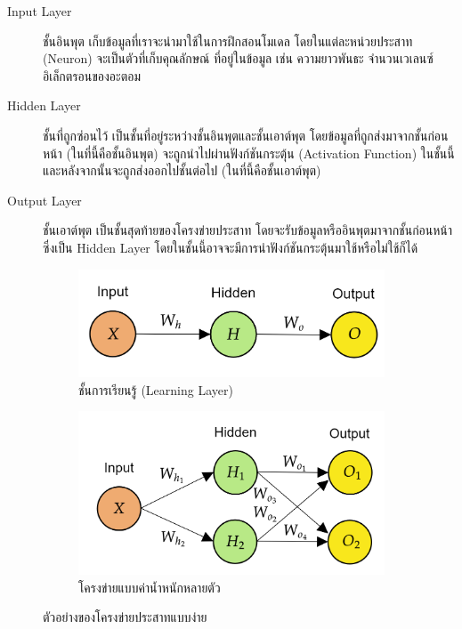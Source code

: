 \begin{description}
    \item[Input Layer] ชั้นอินพุต เก็บข้อมูลที่เราจะนำมาใช้ในการฝึกสอนโมเดล โดยในแต่ละหน่วยประสาท (Neuron) จะเป็นตัวที่เก็บคุณลักษณ์%
    ที่อยู่ในข้อมูล เช่น ความยาวพันธะ จำนวนเวเลนซ์อิเล็กตรอนของอะตอม
    
    \item[Hidden Layer] ชั้นที่ถูกซ่อนไว้ เป็นชั้นที่อยู่ระหว่างชั้นอินพุตและชั้นเอาต์พุต โดยข้อมูลที่ถูกส่งมาจากชั้นก่อนหน้า (ในที่นี้คือชั้นอินพุต)
    จะถูกนำไปผ่านฟังก์ชันกระตุ้น (Activation Function) ในชั้นนี้ และหลังจากนั้นจะถูกส่งออกไปชั้นต่อไป (ในที่นี้คือชั้นเอาต์พุต)
    
    \item[Output Layer] ชั้นเอาต์พุต เป็นชั้นสุดท้ายของโครงข่ายประสาท โดยจะรับข้อมูลหรืออินพุตมาจากชั้นก่อนหน้าซึ่งเป็น Hidden Layer
    โดยในชั้นนี้อาจจะมีการนำฟังก์ชันกระตุ้นมาใช้หรือไม่ใช้ก็ได้
\end{description}

\begin{figure}[H]
    \centering
    \begin{subfigure}{0.5\textwidth}
        \centering
        \includegraphics[width=0.9\linewidth]{fig/nn_layer.png}
        \caption{ชั้นการเรียนรู้ (Learning Layer)}
        \label{fig:nn_layer}
    \end{subfigure}%
    \begin{subfigure}{0.5\textwidth}
        \centering
        \includegraphics[width=0.9\linewidth]{fig/nn_w_matrices.png}
        \caption{โครงข่ายแบบค่าน้ำหนักหลายตัว}
        \label{fig:nn_w_matrices}
    \end{subfigure}
    \caption{ตัวอย่างของโครงข่ายประสาทแบบง่าย}
    \label{fig:nn_layer_w}
\end{figure}

